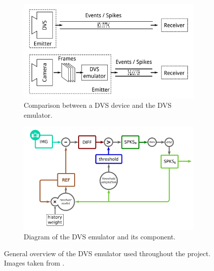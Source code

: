 \begin{figure}[ht]
\centering
\begin{subfigure}{0.49\textwidth}
\includegraphics[width=\textwidth]{images/context/dvs_comparison.png} 
\caption{Comparison between a DVS device and the DVS emulator.}
\label{fig:dvs_comparison}
\end{subfigure}
\begin{subfigure}{0.49\textwidth}
\includegraphics[width=\textwidth]{images/context/dvs_diagram.png}
\caption{Diagram of the DVS emulator and its component.}
\label{fig:dvs_diagram}
\end{subfigure}
\caption[DVS Emulator]{General overview of the DVS emulator used throughout the project. Images taken from \cite{Garcia2017}.}
\label{fig:dvs_emulator}
\end{figure}

